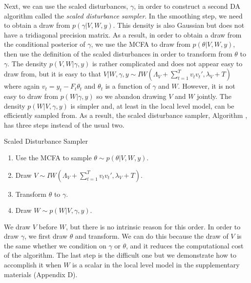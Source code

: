 \documentclass[12pt]{article}
\begin{document}
Next, we can use the scaled disturbances, $\gamma$, in order to construct a second DA algorithm called the {\it scaled disturbance sampler}. In the smoothing step, we need to obtain a draw from $p(\gamma|V,W,y)$. This density is also Gaussian but does not have a tridiagonal precision matrix. As a result, in order to obtain a draw from the conditional posterior of $\gamma$, we use the MCFA to draw from $p(\theta|V,W,y)$, then use the definition of the scaled disturbances in order to transform from $\theta$ to $\gamma$. The density $p(V,W|\gamma,y)$ is rather complicated and does not appear easy to draw from, but it is easy to that $V|W,\gamma,y \sim IW\left(\Lambda_V + \sum_{t=1}^Tv_tv_t',\lambda_V + T\right)$ where again $v_t = y_t - F_t\theta_t$ and $\theta_t$ is a function of $\gamma$ and $W$. However, it is not easy to draw from $p(W|\gamma,y)$ so we abandon drawing $V$ and $W$ jointly. The density $p(W|V,\gamma,y)$ is simpler and, at least in the local level model, can be efficiently sampled from. As a result, the scaled disturbance sampler, Algorithm , has three steps instead of the usual two. 
\begin{alg*}[SD]Scaled Disturbance Sampler\label{alg:DLMdist}
\begin{enumerate}
\item Use the MCFA to sample $\theta \sim p(\theta|V,W,y)$.
\item Draw $V \sim IW\left(\Lambda_V + \sum_{t=1}^Tv_tv_t',\lambda_V + T\right)$.
\item Transform $\theta$ to $\gamma$.
\item Draw $W \sim p(W|V,\gamma,y)$.
\end{enumerate}
\end{alg*}\noindent
We draw $V$ before $W$, but there is no intrinsic reason for this order. In order to draw $\gamma$, we first draw $\theta$ and transform. We can do this because the draw of $V$ is the same whether we condition on $\gamma$ or $\theta$, and it reduces the computational cost of the algorithm. The last step is the difficult one but we demonstrate how to accomplish it when $W$ is a scalar in the local level model in the supplementary materials (Appendix D).
\end{document}
